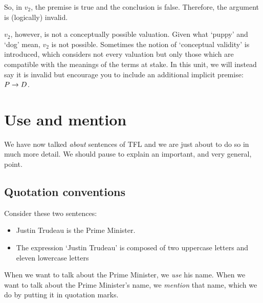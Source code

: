 So, in $v_2$, the premise is true and the conclusion is false. Therefore, the argument is (logically) invalid.

$v_2$, however, is not a conceptually possible valuation. Given what `puppy' and `dog' mean, $v_2$ is not possible. 
Sometimes the notion of `conceptual validity' is introduced, which considers not every valuation but only those which are compatible with the meanings of the terms at stake. In this unit, we will instead say it is invalid but encourage you to include an additional implicit premise: $P\rightarrow D$. 







\chapter{Use and mention}\label{sec:UseMention}
We have now talked \emph{about} sentences of TFL and we are just about to do so in much more detail. We should pause to explain an important, and very general, point.

\section{Quotation conventions}
Consider these two sentences:
\begin{itemize}
	\item Justin Trudeau is the Prime Minister.
	\item The expression `Justin Trudeau' is composed of two uppercase letters and eleven lowercase letters
\end{itemize}
When we want to talk about the Prime Minister, we \emph{use} his name. When we want to talk about the Prime Minister's name, we \emph{mention} that name, which we do by putting it in quotation marks.

